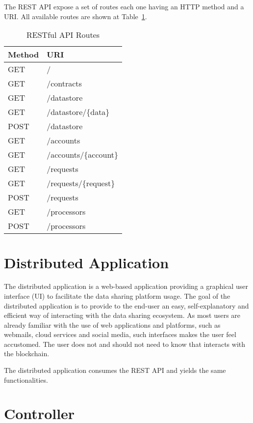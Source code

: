 The REST API expose a set of routes each one having an HTTP method and a URI. All available routes are shown at Table~\ref{table:api_routes}.

\begin{table}[ht!]
\centering
\caption{RESTful API Routes}
\begin{tabular}{|l|l|}
\hline
 Method & URI  \\ \hline
 GET & /\  \\ \hline
 GET &  /contracts \\ \hline
 GET &  /datastore \\ \hline
 GET &  /datastore/\{data\} \\ \hline
 POST &  /datastore\\ \hline
 GET &  /accounts \\ \hline
 GET &  /accounts/\{account\} \\ \hline
 GET &  /requests \\ \hline
 GET &  /requests/\{request\} \\ \hline
 POST &  /requests \\ \hline
 GET &  /processors \\ \hline
 POST &  /processors \\ \hline
\end{tabular}
\label{table:api_routes}
\end{table}

\section{Distributed Application}
\label{implemenation:dapp}

The distributed application is a web-based application providing a graphical user interface (UI) to facilitate the data sharing platform usage. The goal of the distributed application is to provide to the end-user an easy, self-explanatory and efficient way of interacting with the data sharing ecosystem. As most users are already familiar with the use of web applications and platforms, such as webmails, cloud services and social media, such interfaces makes the user feel accustomed. The user does not and should not need to know that interacts with the blockchain.

The distributed application consumes the REST API and yields the same functionalities.

\section{Controller}
\label{implemenation:controller}

